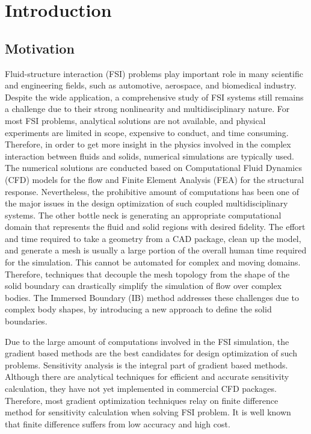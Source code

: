 \chapter{Introduction}\label{ch:introduction}
\section{Motivation}
Fluid-structure interaction (FSI) problems play important role in many scientific and engineering fields, such as automotive, aerospace, and biomedical industry. Despite the wide application, a comprehensive study of FSI systems still remains a challenge due to their strong nonlinearity and multidisciplinary nature. For most FSI problems, analytical solutions are not available, and physical experiments are limited in scope, expensive to conduct, and time consuming. Therefore, in order to get more insight in the physics involved in the complex interaction between fluids and solids, numerical simulations are typically used. The numerical solutions are conducted based on Computational Fluid Dynamics (CFD) models for the flow and Finite Element Analysis (FEA) for the structural response. Nevertheless, the prohibitive amount of computations has been one of the major issues in the design optimization of such coupled multidisciplinary systems. The other bottle neck is generating an appropriate computational domain that represents the fluid and solid regions with desired fidelity. The effort and time required to take a geometry from a CAD package, clean up the model, and generate a mesh is usually a large portion of the overall human time required for the simulation. This cannot be automated for complex and moving domains. Therefore, techniques that decouple the mesh topology from the shape of the solid boundary can drastically simplify the simulation of flow over complex bodies. The Immersed Boundary (IB) method addresses these challenges due to complex body shapes, by introducing a new approach to define the solid boundaries.

Due to the large amount of computations involved in the FSI simulation, the gradient based methods are the best candidates for design optimization of such problems. Sensitivity analysis is the integral part of gradient based methods. Although there are analytical techniques for efficient and accurate sensitivity calculation, they have not yet implemented in commercial CFD packages. Therefore, most gradient optimization techniques relay on finite difference method for sensitivity calculation when solving FSI problem. It is well known that finite difference suffers from low accuracy and high cost.

